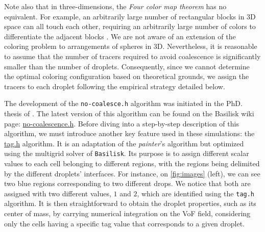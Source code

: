 Note also that in three-dimensions, the \textit{Four color map theorem} has no equivalent.
For example, an arbitrarily large number of rectangular blocks in 3D space can all touch each other, requiring an arbitrarily large number of colors to differentiate the adjacent blocks \citep{magnant2011coloring}. 
We are not aware of an extension of the coloring problem to arrangements of spheres in 3D. 
Nevertheless, it is reasonable to assume that the number of tracers required to avoid coalescence is significantly smaller than the number of droplets.
Consequently, since we cannot determine the optimal coloring configuration based on theoretical grounds, we assign the tracers to each droplet following the empirical strategy detailed below.

The development of the \texttt{no-coalesce.h} algorithm was initiated in the PhD. thesis of \citet{mani2021numerical}.
The latest version of this algorithm can be found on the Basilisk wiki page: \href{http://basilisk.fr/sandbox/fintzin/Rising-Suspenion/no-coalescence.h}{no-coalescence.h}.
Before diving into a step-by-step description of this algorithm, we must introduce another key feature used in these simulations: the \href{http://basilisk.fr/src/tag.h}{tag.h} algorithm. 
It is an adaptation of the \textit{painter}'s algorithm but optimized using the multigrid solver of \texttt{Basilisk}. 
Its purpose is to assign different scalar values to each cell belonging to different regions, with the regions being delimited by the different droplets' interfaces. 
For instance, on \ref{fig:images} (left), we can see two blue regions corresponding to two different drops.
We notice that both are assigned with two different values, $1$ and $2$, which are identified using the \texttt{tag.h} algorithm. 
It is then straightforward to obtain the droplet properties, such as its center of mass, by carrying numerical integration on the VoF field, considering only the cells having a specific tag value that corresponds to a given droplet.  

